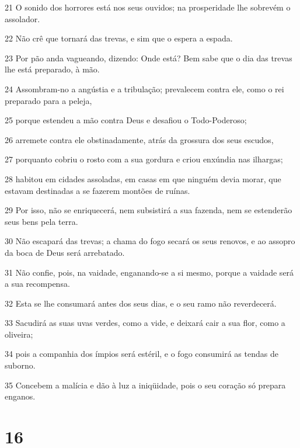 \par 21 O sonido dos horrores está nos seus ouvidos; na prosperidade lhe sobrevém o assolador.
\par 22 Não crê que tornará das trevas, e sim que o espera a espada.
\par 23 Por pão anda vagueando, dizendo: Onde está? Bem sabe que o dia das trevas lhe está preparado, à mão.
\par 24 Assombram-no a angústia e a tribulação; prevalecem contra ele, como o rei preparado para a peleja,
\par 25 porque estendeu a mão contra Deus e desafiou o Todo-Poderoso;
\par 26 arremete contra ele obstinadamente, atrás da grossura dos seus escudos,
\par 27 porquanto cobriu o rosto com a sua gordura e criou enxúndia nas ilhargas;
\par 28 habitou em cidades assoladas, em casas em que ninguém devia morar, que estavam destinadas a se fazerem montões de ruínas.
\par 29 Por isso, não se enriquecerá, nem subsistirá a sua fazenda, nem se estenderão seus bens pela terra.
\par 30 Não escapará das trevas; a chama do fogo secará os seus renovos, e ao assopro da boca de Deus será arrebatado.
\par 31 Não confie, pois, na vaidade, enganando-se a si mesmo, porque a vaidade será a sua recompensa.
\par 32 Esta se lhe consumará antes dos seus dias, e o seu ramo não reverdecerá.
\par 33 Sacudirá as suas uvas verdes, como a vide, e deixará cair a sua flor, como a oliveira;
\par 34 pois a companhia dos ímpios será estéril, e o fogo consumirá as tendas de suborno.
\par 35 Concebem a malícia e dão à luz a iniqüidade, pois o seu coração só prepara enganos.

\chapter{16}

